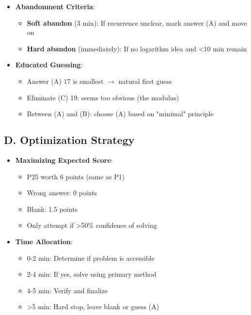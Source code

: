 \documentclass[11pt]{article}
\begin{document}
\begin{competitionbox}
\begin{itemize}[leftmargin=*]
    \item \textbf{Abandonment Criteria}:
    \begin{itemize}
        \item \textbf{Soft abandon} (3 min): If recurrence unclear, mark answer (A) and move on
        \item \textbf{Hard abandon} (immediately): If no logarithm idea and <10 min remain
    \end{itemize}
    
    \item \textbf{Educated Guessing}:
    \begin{itemize}
        \item Answer (A) 17 is smallest $\rightarrow$ natural first guess
        \item Eliminate (C) 19: seems too obvious (the modulus)
        \item Between (A) and (B): choose (A) based on "minimal" principle
    \end{itemize}
\end{itemize}

\subsection*{D. Optimization Strategy}
\begin{itemize}[leftmargin=*]
    \item \textbf{Maximizing Expected Score}:
    \begin{itemize}
        \item P25 worth 6 points (same as P1)
        \item Wrong answer: 0 points
        \item Blank: 1.5 points
        \item Only attempt if >50\% confidence of solving
    \end{itemize}
    
    \item \textbf{Time Allocation}:
    \begin{itemize}
        \item 0-2 min: Determine if problem is accessible
        \item 2-4 min: If yes, solve using primary method
        \item 4-5 min: Verify and finalize
        \item >5 min: Hard stop, leave blank or guess (A)
    \end{itemize}
\end{itemize}
\end{competitionbox}
\end{document}
